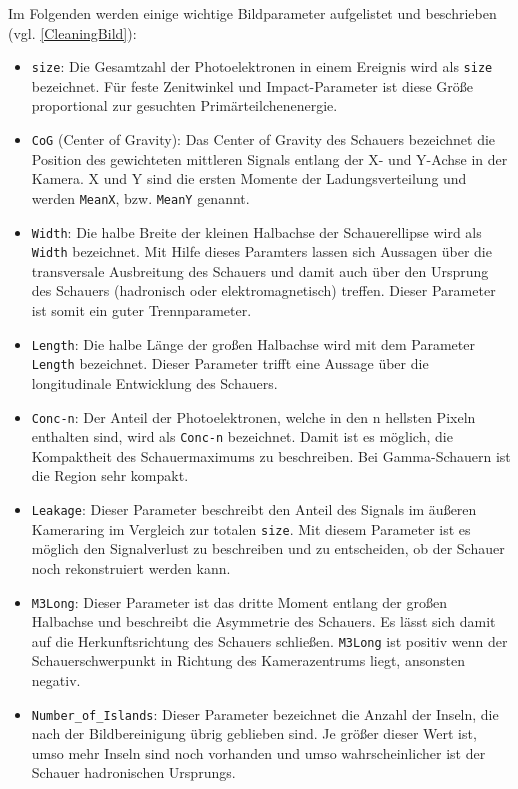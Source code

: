 Im Folgenden werden einige wichtige Bildparameter aufgelistet und beschrieben (vgl. \autoref{CleaningBild}):

\begin{itemize}
 \item \texttt{size}: Die Gesamtzahl der Photoelektronen in einem Ereignis wird als \texttt{size} bezeichnet. Für feste Zenitwinkel und Impact-Parameter ist diese Größe proportional zur gesuchten Primärteilchenenergie.
 \item \texttt{CoG} (Center of Gravity): Das Center of Gravity des Schauers bezeichnet die Position des gewichteten mittleren Signals entlang der X- und Y-Achse in der Kamera. 
 X und Y sind die ersten Momente der Ladungsverteilung und werden \texttt{MeanX}, bzw. \texttt{MeanY} genannt.
 \item \texttt{Width}: Die halbe Breite der kleinen Halbachse der Schauerellipse wird als \texttt{Width} bezeichnet. 
 Mit Hilfe dieses Paramters lassen sich Aussagen über die transversale Ausbreitung des Schauers und damit auch über den Ursprung des Schauers (hadronisch oder elektromagnetisch) treffen. 
 Dieser Parameter ist somit ein guter Trennparameter.
 \item \texttt{Length}: Die halbe Länge der großen Halbachse wird mit dem Parameter \texttt{Length} bezeichnet.
 Dieser Parameter trifft eine Aussage über die longitudinale Entwicklung des Schauers.
 \item \texttt{Conc-n}: Der Anteil der Photoelektronen, welche in den n hellsten Pixeln enthalten sind, wird als \texttt{Conc-n} bezeichnet.
 Damit ist es möglich, die Kompaktheit des Schauermaximums zu beschreiben. 
 Bei Gamma-Schauern ist die Region sehr kompakt.
 \item \texttt{Leakage}: Dieser Parameter beschreibt den Anteil des Signals im äußeren Kameraring im Vergleich zur totalen \texttt{size}.
 Mit diesem Parameter ist es möglich den Signalverlust zu beschreiben und zu entscheiden, ob der Schauer noch rekonstruiert werden kann.
 \item \texttt{M3Long}: Dieser Parameter ist das dritte Moment entlang der großen Halbachse und beschreibt die Asymmetrie des Schauers.
 Es lässt sich damit auf die Herkunftsrichtung des Schauers schließen. 
 \texttt{M3Long} ist positiv wenn der Schauerschwerpunkt in Richtung des Kamerazentrums liegt, ansonsten negativ.
 \item \texttt{Number\_of\_Islands}: Dieser Parameter bezeichnet die Anzahl der Inseln, die nach der Bildbereinigung übrig geblieben sind. 
 Je größer dieser Wert ist, umso mehr Inseln sind noch vorhanden und umso wahrscheinlicher ist der Schauer hadronischen Ursprungs.
\end{itemize}

